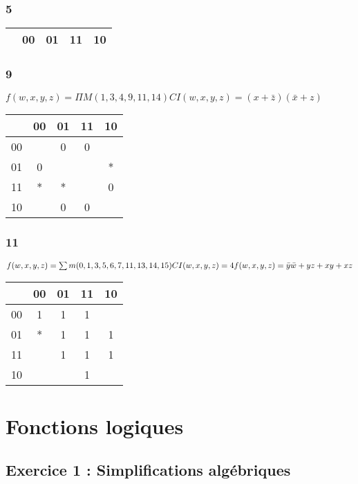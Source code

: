 \documentclass[12pt,a4paper,openany]{book}
\begin{document}
	\subsection{5}
	\begin{tabular}{c|c|c|c|c|}
		& 00&01&11&10\\
		\hline
	\end{tabular}
	\subsection{9}
	$f(w,x,y,z) = \Pi M(1,3,4,9,11,14) CI(w,x,y,z) = (x+\bar z)(\bar x + z)$\\
	\begin{tabular}{c|c|c|c|c|}
		& 00&01&11&10\\
		\hline
		00&&0&0&\\
		\hline
		01&0&&&*\\
		\hline
		11&*&*&&0\\
		\hline
		10&&0&0&\\
		\hline
	\end{tabular}
	\subsection{11}
	$f(w,x,y,z) = \sum m(0,1,3,5,6,7,11,13,14,15) CI(w,x,y,z) = 4\\
	f(w,x,y,z) = \bar y \bar w + yz + xy +xz$\\
	\begin{tabular}{c|c|c|c|c|}
		& 00&01&11&10\\
		\hline
		00&1&1&1&\\
		\hline
		01&*&1&1&1\\
		\hline
		11&&1&1&1\\
		\hline
		10&&&1&\\
		\hline
	\end{tabular}

	\chapter{Fonctions logiques}
	\section{Exercice 1 : Simplifications algébriques}
\end{document}
